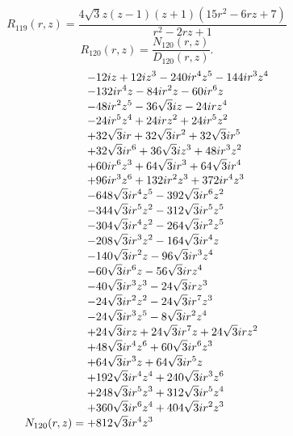 \documentclass[11pt,a4paper]{article}
\begin{document}
\begin{equation}
R_{119}(r,z)=\frac{4 \sqrt{3} z \left(z - 1\right) \left(z + 1\right) \left(15 r^{2} - 6 r z + 7\right)}{r^{2} - 2 r z + 1}
\label{eq:cat-rational-119}
\end{equation}
\begin{equation}
R_{120}(r,z)=\frac{N_{120}(r,z)}{D_{120}(r,z)}.
\label{eq:cat-rational-120}
\end{equation}
\begin{equation}
N_{120}(r,z)=\shortstack[l]{$\displaystyle  - 12 i z + 12 i z^{3} - 240 i r^{4} z^{5} - 144 i r^{3} z^{4}$\\
$\displaystyle  - 132 i r^{4} z - 84 i r^{2} z - 60 i r^{6} z$\\
$\displaystyle  - 48 i r^{2} z^{5} - 36 \sqrt{3} i z - 24 i r z^{4}$\\
$\displaystyle  - 24 i r^{5} z^{4} + 24 i r z^{2} + 24 i r^{5} z^{2}$\\
$\displaystyle  + 32 \sqrt{3} i r + 32 \sqrt{3} i r^{2} + 32 \sqrt{3} i r^{5}$\\
$\displaystyle  + 32 \sqrt{3} i r^{6} + 36 \sqrt{3} i z^{3} + 48 i r^{3} z^{2}$\\
$\displaystyle  + 60 i r^{6} z^{3} + 64 \sqrt{3} i r^{3} + 64 \sqrt{3} i r^{4}$\\
$\displaystyle  + 96 i r^{3} z^{6} + 132 i r^{2} z^{3} + 372 i r^{4} z^{3}$\\
$\displaystyle  - 648 \sqrt{3} i r^{4} z^{5} - 392 \sqrt{3} i r^{6} z^{2}$\\
$\displaystyle  - 344 \sqrt{3} i r^{5} z^{2} - 312 \sqrt{3} i r^{5} z^{5}$\\
$\displaystyle  - 304 \sqrt{3} i r^{4} z^{2} - 264 \sqrt{3} i r^{2} z^{5}$\\
$\displaystyle  - 208 \sqrt{3} i r^{3} z^{2} - 164 \sqrt{3} i r^{4} z$\\
$\displaystyle  - 140 \sqrt{3} i r^{2} z - 96 \sqrt{3} i r^{3} z^{4}$\\
$\displaystyle  - 60 \sqrt{3} i r^{6} z - 56 \sqrt{3} i r z^{4}$\\
$\displaystyle  - 40 \sqrt{3} i r^{3} z^{3} - 24 \sqrt{3} i r z^{3}$\\
$\displaystyle  - 24 \sqrt{3} i r^{2} z^{2} - 24 \sqrt{3} i r^{7} z^{3}$\\
$\displaystyle  - 24 \sqrt{3} i r^{3} z^{5} - 8 \sqrt{3} i r^{2} z^{4}$\\
$\displaystyle  + 24 \sqrt{3} i r z + 24 \sqrt{3} i r^{7} z + 24 \sqrt{3} i r z^{2}$\\
$\displaystyle  + 48 \sqrt{3} i r^{4} z^{6} + 60 \sqrt{3} i r^{6} z^{3}$\\
$\displaystyle  + 64 \sqrt{3} i r^{3} z + 64 \sqrt{3} i r^{5} z$\\
$\displaystyle  + 192 \sqrt{3} i r^{4} z^{4} + 240 \sqrt{3} i r^{3} z^{6}$\\
$\displaystyle  + 248 \sqrt{3} i r^{5} z^{3} + 312 \sqrt{3} i r^{5} z^{4}$\\
$\displaystyle  + 360 \sqrt{3} i r^{6} z^{4} + 404 \sqrt{3} i r^{2} z^{3}$\\
$\displaystyle  + 812 \sqrt{3} i r^{4} z^{3}$}
\label{eq:cat-numerator-120}
\end{equation}
\end{document}
